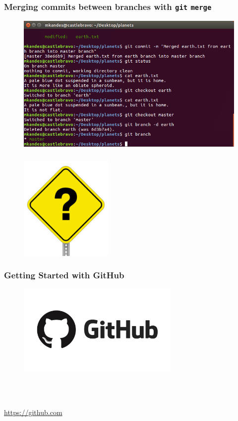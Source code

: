 \documentclass{beamer}
\begin{document}
\begin{frame}
   \frametitle{Merging commits between branches with \texttt{git} \texttt{merge}}
   \begin{figure}[htbp]
      \includegraphics[width=1.0\textwidth]{images/git-merge-with-conflict-part3.png}
   \end{figure}
\end{frame}

\begin{frame}
   \frametitle{}
   \vspace{-1.0em}
   \begin{figure}[htbp]
      \includegraphics[width=0.4\textwidth]{images/question-mark-sign.jpg}
   \end{figure}
\end{frame}

\begin{frame}
   \frametitle{Getting Started with GitHub}
   \begin{figure}[htbp]
      \includegraphics[width=0.7\textwidth]{images/github-logo.jpg}
   \end{figure}
   \ \\ \ \\
   \begin{center}
      \url{https://github.com}
   \end{center}
\end{frame}
\end{document}
